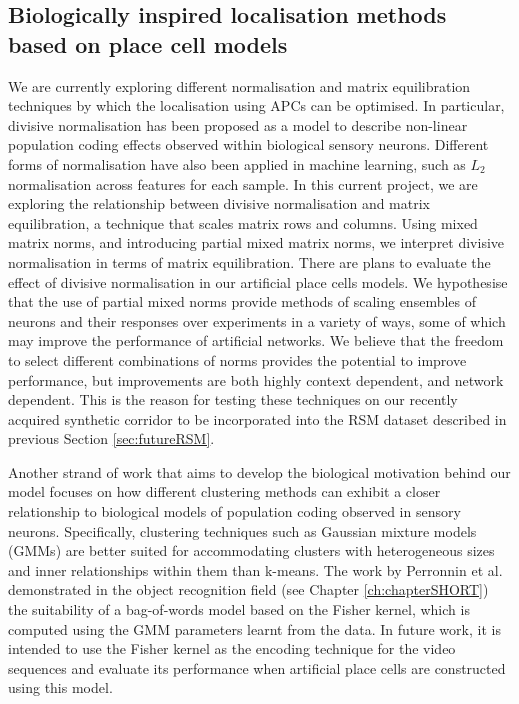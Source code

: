 \subsection{Biologically inspired localisation methods based on place cell models}

We are currently exploring different normalisation and matrix equilibration techniques by which the localisation using APCs can be optimised. In particular, divisive normalisation has been proposed as a model to describe non-linear population coding effects observed within biological sensory neurons. Different forms of normalisation have also been applied in machine learning, such as $L_2$ normalisation across features for each sample. In this current project, we are exploring the relationship between divisive normalisation and matrix equilibration, a technique that scales matrix rows and columns. Using mixed matrix norms, and introducing partial mixed matrix norms, we interpret divisive normalisation in terms of matrix equilibration. There are plans to evaluate the effect of divisive normalisation in our artificial place cells models. We hypothesise that the use of partial mixed norms provide methods of scaling ensembles of neurons and their responses over experiments in a variety of ways, some of which may improve the performance of artificial networks. We believe that the freedom to select different combinations of norms provides the potential to improve performance, but improvements are both highly context dependent, and network dependent. This is the reason for testing these techniques on our recently acquired synthetic corridor to be incorporated into the RSM dataset described in previous Section \ref{sec:futureRSM}.


Another strand of work that aims to develop the biological motivation behind our model focuses on how different clustering methods can exhibit a closer relationship to biological models of population coding observed in sensory neurons. Specifically, clustering techniques such as Gaussian mixture models (GMMs) are better suited for accommodating clusters with heterogeneous sizes and inner relationships within them than k-means. The work by Perronnin et al. \cite{ perronnin2007fisher, Perronnin2010, Jegou2012} demonstrated in the object recognition field (see Chapter \ref{ch:chapterSHORT}) the suitability of a bag-of-words model based on the Fisher kernel, which is computed using the GMM parameters learnt from the data. In future work, it is intended to use the Fisher kernel as the encoding technique for the video sequences and evaluate its performance when artificial place cells are constructed using this model.


